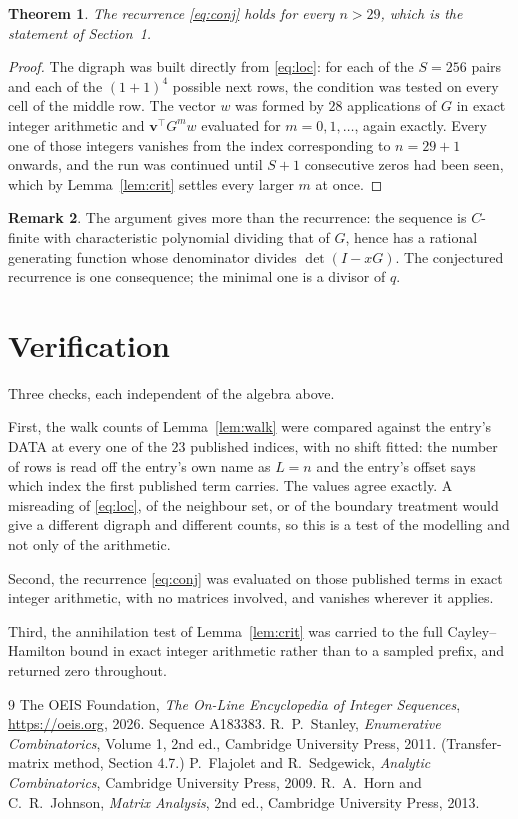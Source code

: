 \documentclass[11pt,a4paper]{article}
\theoremstyle{plain}
\newtheorem{theorem}{Theorem}
\theoremstyle{definition}
\newtheorem{remark}[theorem]{Remark}
\begin{document}
\begin{theorem}
The recurrence \eqref{eq:conj} holds for every $n>29$, which is the statement of
Section~1.
\end{theorem}

\begin{proof}
The digraph was built directly from \eqref{eq:loc}: for each of the $S=256$ pairs and each
of the $(1+1)^{4}$ possible next rows, the condition was tested on every cell of
the middle row. The vector $w$ was formed by $28$ applications of $G$ in exact integer
arithmetic and $\mathbf{v}^{\!\top}G^{m}w$ evaluated for $m=0,1,\dots$, again exactly.
Every one of those integers vanishes from the index corresponding to $n=29+1$ onwards,
and the run was continued until $S+1$ consecutive zeros had been seen, which by
Lemma~\ref{lem:crit} settles every larger $m$ at once.
\end{proof}

\begin{remark}
The argument gives more than the recurrence: the sequence is $C$-finite with characteristic
polynomial dividing that of $G$, hence has a rational generating function whose denominator
divides $\det(I-xG)$. The conjectured recurrence is one consequence; the minimal one is a
divisor of $q$.
\end{remark}

\section{Verification}

Three checks, each independent of the algebra above.

First, the walk counts of Lemma~\ref{lem:walk} were compared against the entry's DATA at
every one of the $23$ published indices, with no shift fitted: the number of rows is
read off the entry's own name as $L=n$ and the entry's offset says which index the first
published term carries. The values agree exactly. A misreading of \eqref{eq:loc}, of the
neighbour set, or of the boundary treatment would give a different digraph and different
counts, so this is a test of the modelling and not only of the arithmetic.

Second, the recurrence \eqref{eq:conj} was evaluated on those published terms in exact
integer arithmetic, with no matrices involved, and vanishes wherever it applies.

Third, the annihilation test of Lemma~\ref{lem:crit} was carried to the full
Cayley--Hamilton bound in exact integer arithmetic rather than to a sampled prefix, and
returned zero throughout.

\begin{thebibliography}{9}
 The OEIS Foundation, \emph{The On-Line Encyclopedia of Integer
Sequences}, \url{https://oeis.org}, 2026. Sequence A183383.
 R.~P.~Stanley, \emph{Enumerative Combinatorics}, Volume 1, 2nd ed.,
Cambridge University Press, 2011. (Transfer-matrix method, Section 4.7.)
 P.~Flajolet and R.~Sedgewick, \emph{Analytic Combinatorics}, Cambridge
University Press, 2009.
 R.~A.~Horn and C.~R.~Johnson, \emph{Matrix Analysis}, 2nd ed., Cambridge
University Press, 2013.
\end{thebibliography}
\end{document}
